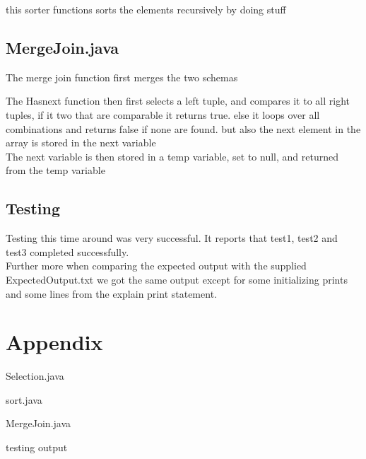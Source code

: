 \documentclass[a4paper,10pt,titlepage]{report}
\begin{document}
this sorter functions sorts the elements recursively by doing stuff
	
\subsection{MergeJoin.java}
The merge join function first merges the two schemas


The Hasnext function then first selects a left tuple, and compares it to all right tuples, if it two that are comparable it returns true. else it loops over all combinations and returns false if none are found. but also the next element in the array is stored in the next variable\\

The next variable is then stored in a temp variable, set to null, and returned from the temp variable


\subsection{Testing}
Testing this time around was very successful. It reports that test1, test2 and test3 completed successfully. \\
Further more when comparing the expected output with the supplied ExpectedOutput.txt we got the same output except for some initializing  prints and some lines from the explain print statement. \\

\section{Appendix}
Selection.java


sort.java


MergeJoin.java


testing output

\end{document}
